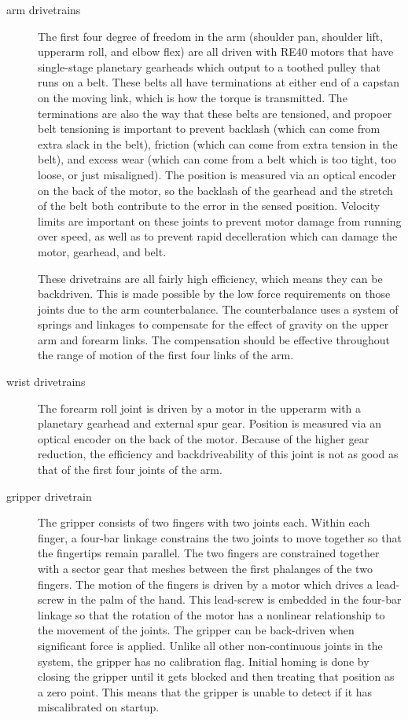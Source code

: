 \begin{description}
\item[arm drivetrains]
The first four degree of freedom in the arm (shoulder pan, shoulder lift, upperarm roll, and elbow flex) are all driven with RE40 motors that have single-stage planetary gearheads which output to a toothed pulley that runs on a belt.  These belts all have terminations at either end of a capstan on the moving link, which is how the torque is transmitted.  The terminations are also the way that these belts are tensioned, and propoer belt tensioning is important to prevent backlash (which can come from extra slack in the belt), friction (which can come from extra tension in the belt), and excess wear (which can come from a belt which is too tight, too loose, or just misaligned).  The position is measured via an optical encoder on the back of the motor, so the backlash of the gearhead and the stretch of the belt both contribute to the error in the sensed position.  Velocity limits are important on these joints to prevent motor damage from running over speed, as well as to prevent rapid decelleration which can damage the motor, gearhead, and belt.

These drivetrains are all fairly high efficiency, which means they can be backdriven.  This is made possible by the low force requirements on those joints due to the arm counterbalance.  The counterbalance uses a system of springs and linkages to compensate for the effect of gravity on the upper arm and forearm links.  The compensation should be effective throughout the range of motion of the first four links of the arm.

\item[wrist drivetrains]
The forearm roll joint is driven by a motor in the upperarm with a planetary gearhead and external spur gear.  Position is measured via an optical encoder on the back of the motor.  Because of the higher gear reduction, the efficiency and backdriveability of this joint is not as good as that of the first four joints of the arm.

\item[gripper drivetrain]
The gripper consists of two fingers with two joints each.  Within each finger, a four-bar linkage constrains the two joints to move together so that the fingertips remain parallel.  The two fingers are constrained together with a sector gear that meshes between the first phalanges of the two fingers.  The motion of the fingers is driven by a motor which drives a lead-screw in the palm of the hand.  This lead-screw is embedded in the four-bar linkage so that the rotation of the motor has a nonlinear relationship to the movement of the joints.  The gripper can be back-driven when significant force is applied.  Unlike all other non-continuous joints in the system, the gripper has no calibration flag.  Initial homing is done by closing the gripper until it gets blocked and then treating that position as a zero point.  This means that the gripper is unable to detect if it has miscalibrated on startup.

\end{description}


